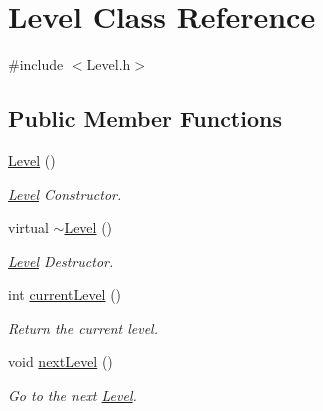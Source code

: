 \hypertarget{class_level}{}\section{Level Class Reference}
\label{class_level}


{\ttfamily \#include $<$Level.\+h$>$}

\subsection*{Public Member Functions}
\begin{DoxyCompactItemize}
\item 
\mbox{\label{class_level_a7a696c928ca5d5354db6e50e46d0f67d}} 
\hyperlink{class_level_a7a696c928ca5d5354db6e50e46d0f67d}{Level} ()
\begin{DoxyCompactList}\small\item\em \hyperlink{class_level}{Level} Constructor. \end{DoxyCompactList}\item 
\mbox{\label{class_level_a249eac1e8f19ff44134efa5e986feaca}} 
virtual \hyperlink{class_level_a249eac1e8f19ff44134efa5e986feaca}{$\sim$\+Level} ()
\begin{DoxyCompactList}\small\item\em \hyperlink{class_level}{Level} Destructor. \end{DoxyCompactList}\item 
\mbox{\label{class_level_a7ee14ca534888973fab088e511db1341}} 
int \hyperlink{class_level_a7ee14ca534888973fab088e511db1341}{current\+Level} ()
\begin{DoxyCompactList}\small\item\em Return the current level. \end{DoxyCompactList}\item 
\mbox{\label{class_level_a9e00624c99565b0bc3cedf7b7971818e}} 
void \hyperlink{class_level_a9e00624c99565b0bc3cedf7b7971818e}{next\+Level} ()
\begin{DoxyCompactList}\small\item\em Go to the next \hyperlink{class_level}{Level}. \end{DoxyCompactList}\item 
\mbox{\label{class_level_a702a1a057a4572ea37b701126501621a}} 

\end{DoxyCompactItemize}
